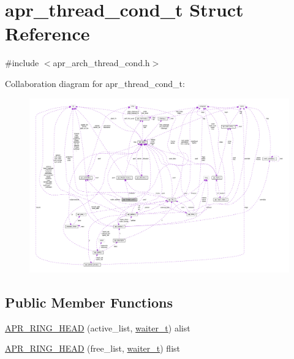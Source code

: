 \hypertarget{structapr__thread__cond__t}{}\section{apr\+\_\+thread\+\_\+cond\+\_\+t Struct Reference}
\label{structapr__thread__cond__t}


{\ttfamily \#include $<$apr\+\_\+arch\+\_\+thread\+\_\+cond.\+h$>$}



Collaboration diagram for apr\+\_\+thread\+\_\+cond\+\_\+t\+:
\nopagebreak
\begin{figure}[H]
\begin{center}
\leavevmode
\includegraphics[width=350pt]{structapr__thread__cond__t__coll__graph}
\end{center}
\end{figure}
\subsection*{Public Member Functions}
\begin{DoxyCompactItemize}
\item 
\hyperlink{structapr__thread__cond__t_a1bc8b19ee763a078844517a30e96abda}{A\+P\+R\+\_\+\+R\+I\+N\+G\+\_\+\+H\+E\+AD} (active\+\_\+list, \hyperlink{structwaiter__t}{waiter\+\_\+t}) alist
\item 
\hyperlink{structapr__thread__cond__t_a7b569e0b5640e2858441ea18359636d9}{A\+P\+R\+\_\+\+R\+I\+N\+G\+\_\+\+H\+E\+AD} (free\+\_\+list, \hyperlink{structwaiter__t}{waiter\+\_\+t}) flist
\end{DoxyCompactItemize}
